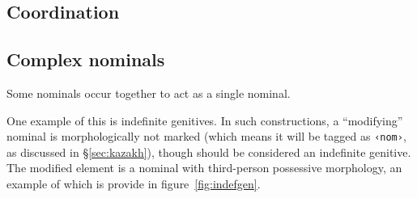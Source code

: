 \documentclass[a4paper,11pt, onecolumn,twoside]{article}
\newcommand{\tag}[1]{\texttt{‹#1›}}
\begin{document}
\subsection{Coordination}

\subsection{Complex nominals}


Some nominals occur together to act as a single nominal.

One example of this is indefinite genitives.  In such constructions, a ``modifying'' nominal is morphologically not marked (which means it will be tagged as \tag{nom}, as discussed in §\ref{sec:kazakh}), though should be considered an indefinite genitive.  The modified element is a nominal with third-person possessive morphology, an example of which is provide in figure~\ref{fig:indefgen}.
\end{document}
